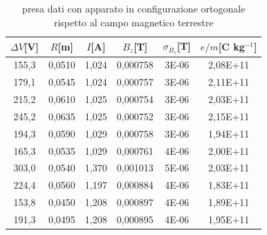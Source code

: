 \documentclass{article}
\begin{document}
     \begin{table}[H]
   
    \centering
        \begin{tabular}{ cccccc } 
            \toprule 
         $\Delta V$[V] & $R$[m] & $I$[A] & $B_z$[T] & $\sigma_{B_z}$[T] & $e/m$[C kg$^{-1}$] \\
            \midrule 
            155,3	&	0,0510	&	1,024	&	0,000758	&	3E-06	&	2,08E+11\\
            179,1	&	0,0545	&	1,024	&	0,000757	&	3E-06	&	2,11E+11\\
            215,2	&	0,0610	&	1,025	&	0,000754	&	3E-06	&	2,03E+11\\
            245,2	&	0,0635	&	1,025	&	0,000752	&	3E-06	&	2,15E+11\\
            194,3	&	0,0590	&	1,029	&	0,000758	&	3E-06	&	1,94E+11\\
            165,3	&	0,0535	&	1,029	&	0,000761	&	4E-06	&	2,00E+11\\
            303,0	&	0,0540	&	1,370	&	0,001013	&	5E-06	&	2,03E+11\\
            224,4	&	0,0560	&	1,197	&	0,000884	&	4E-06	&	1,83E+11\\
            153,8	&	0,0450	&	1,208	&	0,000897	&	4E-06	&	1,89E+11\\
            191,3	&	0,0495	&	1,208	&	0,000895	&	4E-06	&	1,95E+11\\
            \bottomrule           
        \end{tabular}
        \caption{presa dati con apparato in configurazione ortogonale rispetto al campo magnetico terrestre}
        \label{misure ortogonali}
   \end{table}
\end{document}

